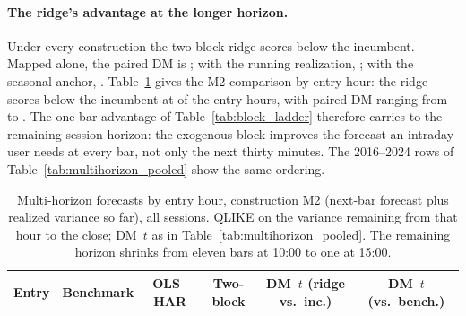 \paragraph{The ridge's advantage at the longer horizon.} Under every
construction the two-block ridge scores below the incumbent. Mapped
alone, the paired DM is \mhMOneDMBlkVsAzero{}; with the running
realization, \mhMTwoDMBlkVsAzero{}; with the seasonal anchor,
\mhMThreeDMBlkVsAzero{}. Table~\ref{tab:multihorizon_byhour} gives the
M2 comparison by entry hour: the ridge scores below the incumbent at
\mhHoursBlkBetter{} of the \mhHoursTotal{} entry hours, with paired DM
ranging from \mhDMBlkVsAzeroMin{} to \mhDMBlkVsAzeroMax{}. The one-bar
advantage of Table~\ref{tab:block_ladder} therefore carries to the
remaining-session horizon: the exogenous block improves the forecast
an intraday user needs at every bar, not only the next thirty minutes.
The 2016--2024 rows of Table~\ref{tab:multihorizon_pooled} show the
same ordering.

\begin{table}[H]
\centering
\caption{Multi-horizon forecasts by entry hour, construction M2 (next-bar
forecast plus realized variance so far), all sessions. QLIKE on the
variance remaining from that hour to the close; DM~$t$ as in
Table~\ref{tab:multihorizon_pooled}. The remaining horizon shrinks from
eleven bars at 10:00 to one at 15:00.
\label{tab:multihorizon_byhour}}
\begin{tabular}{@{}lccccc@{}}
\toprule
Entry & Benchmark & OLS--HAR & Two-block & DM~$t$ (ridge vs.\ inc.) & DM~$t$ (vs.\ bench.) \\
\midrule

\end{tabular}
\end{table}


